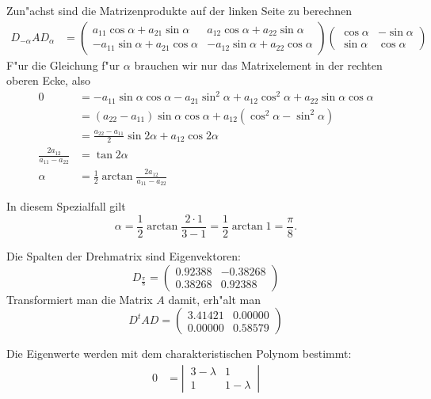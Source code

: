 \begin{loesung}
\begin{teilaufgaben}
\item Zun"achst sind die Matrizenprodukte auf der linken Seite zu berechnen
\begin{align*}
D_{-\alpha}AD_{\alpha}
&=
\begin{pmatrix}
 a_{11}\cos\alpha+a_{21}\sin\alpha & a_{12}\cos\alpha + a_{22}\sin\alpha\\
-a_{11}\sin\alpha+a_{21}\cos\alpha &-a_{12}\sin\alpha + a_{22}\cos\alpha
\end{pmatrix}
\begin{pmatrix}
 \cos\alpha&-\sin\alpha\\
 \sin\alpha& \cos\alpha
\end{pmatrix}
\end{align*}
F"ur die Gleichung f"ur $\alpha$ brauchen wir nur das Matrixelement
in der rechten oberen Ecke, also
\begin{align*}
0
&=
-a_{11}\sin\alpha\cos\alpha -a_{21}\sin^2\alpha+a_{12}\cos^2\alpha+a_{22}\sin\alpha\cos\alpha
\\
&=
(a_{22}-a_{11})\sin\alpha\cos\alpha+a_{12}(\cos^2\alpha-\sin^2\alpha)
\\
&=
\frac{a_{22}-a_{11}}2\sin2\alpha +a_{12}\cos 2\alpha
\\
\frac{2a_{12}}{a_{11}-a_{22}}
&=
\tan2\alpha
\\
\alpha&=\frac12\arctan\frac{2a_{12}}{a_{11}-a_{22}}
\end{align*}
\item
In diesem Spezialfall gilt
\[
\alpha=\frac12\arctan\frac{2\cdot 1}{3 - 1}=\frac12\arctan 1=\frac{\pi}8.
\]
\item
Die Spalten der Drehmatrix sind Eigenvektoren:
\[
D_{\frac{\pi}8}=\begin{pmatrix}
   0.92388& -0.38268\\
   0.38268&  0.92388
\end{pmatrix}
\]
Transformiert man die Matrix $A$ damit, erh"alt man
\[
D^tAD=
\begin{pmatrix}
   3.41421&  0.00000\\
   0.00000&  0.58579
\end{pmatrix}
\]
\item
Die Eigenwerte werden mit dem charakteristischen Polynom bestimmt:
\begin{align*}
0&=\left|\,\begin{matrix}3-\lambda&1\\1&1-\lambda\end{matrix}\,\right|

\end{align*}
\end{teilaufgaben}
\end{loesung}
